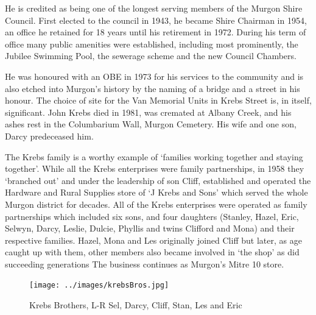 He is credited as being one of the longest serving members of the Murgon Shire Council. First elected to the council in 1943, he became Shire Chairman in 1954, an office he retained for 18 years until his retirement in 1972. During his term of office many public amenities were established, including most prominently, the Jubilee Swimming Pool, the sewerage scheme and the new Council Chambers.



He was honoured with an OBE in 1973 for his services to the community and is also etched into Murgon's history by the naming of a bridge and a street in his honour. The choice of site for the Van Memorial Units in Krebs Street is, in itself, significant. John Krebs died in 1981, was cremated at Albany Creek, and his ashes rest in the Columbarium Wall, Murgon Cemetery. His wife and one son, Darcy predeceased him.



The Krebs family is a worthy example of `families working together and staying together'. While all the Krebs enterprises were family partnerships, in 1958 they `branched out' and under the leadership of son Cliff, established and operated the Hardware and Rural Supplies store of `J Krebs and Sons' which served the whole Murgon district for decades. All of the Krebs enterprises were operated as family partnerships which included six sons, and four daughters (Stanley, Hazel, Eric, Selwyn, Darcy, Leslie, Dulcie, Phyllis and twins Clifford and Mona) and their respective families. Hazel, Mona and Les originally joined Cliff but later, as age caught up with them, other members also became involved in `the shop' as did succeeding generations The business continues as Murgon's Mitre 10 store.









\begin{figure}
\begin{center}
\texttt{[image: ../images/krebsBros.jpg]}
\caption{Krebs Brothers, L-R Sel, Darcy, Cliff, Stan, Les and Eric}
\end{center}
\end{figure}





